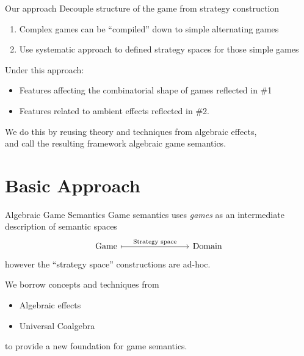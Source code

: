 \documentclass[aspectratio=1610,mathserif]{beamer}
\begin{document}
\begin{frame}{Our approach}
  Decouple structure of the game from strategy construction
  \begin{enumerate}
    \item Complex games can be ``compiled'' down
      to simple alternating games
    \item Use systematic approach to defined strategy spaces
      for those simple games
  \end{enumerate}

  \vspace{1ex}
  Under this approach:
  \begin{itemize}
    \item Features affecting the combinatorial shape of games
      reflected in \#1
    \item Features related to ambient effects
      reflected in \#2.
  \end{itemize}

  \vspace{1ex}
  We do this by reusing theory and techniques from algebraic effects, \\
  and call the resulting framework algebraic game semantics.
\end{frame}

\section{Basic Approach} %
\frame\sectionpage

\begin{frame}[fragile]{Algebraic Game Semantics} %
  Game semantics uses \emph{games} as
  an intermediate description of semantic spaces
  \[
    \begin{tikzcd}[sep=8em]
      \text{Game}
      \ar[r, mapsto, "\text{Strategy space}"] &
      \text{Domain}
    \end{tikzcd}
  \]
  however the ``strategy space'' constructions are ad-hoc.

  \pause
  \vspace{1em}
  We borrow concepts and techniques from
  \begin{itemize}
    \item Algebraic effects
    \item Universal Coalgebra
  \end{itemize}
  to provide a new foundation for game semantics.
\end{frame}
\end{document}

